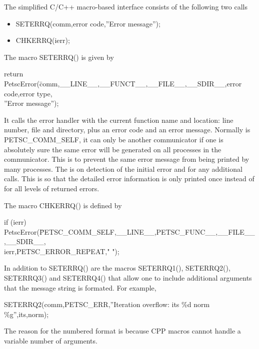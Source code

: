 \documentclass[twoside,12pt]{../sty/report_petsc}
\begin{document}
The simplified C/C++ macro-based interface consists of the following two calls
\begin{itemize}
\item SETERRQ(comm,error code,''Error message'');
\item CHKERRQ(ierr);
\end{itemize}

The macro SETERRQ() is given by
\begin{tabbing}
return PetscError(\=comm,\_\_LINE\_\_,\_\_FUNCT\_\_,\_\_FILE\_\_,\_\_SDIR\_\_,error code,error type,\\
\> ''Error message'');
\end{tabbing}
It calls the error handler with the current function name and location: line number,
file and directory, plus an error code and an error message. Normally  is PETSC_COMM_SELF, it can only be another communicator if
one is absolutely sure the same error will be generated on all processes in the communicator. This is to prevent the same error message from
being printed by many processes. The  is  on detection of the initial error and  for any additional calls. This is so that
the detailed error information is only printed once instead of for all levels of returned errors.

The macro CHKERRQ() is defined by
\begin{tabbing}
  if (ierr)  PetscError(\=PETSC\_COMM\_SELF,\_\_LINE\_\_,PETSC\_FUNC\_\_,\_\_FILE\_\_,\_\_SDIR\_\_, \\
 \>ierr,PETSC\_ERROR\_REPEAT," ");
\end{tabbing}

In addition to SETERRQ() are the macros SETERRQ1(), SETERRQ2(), SETERRQ3()
and SETERRQ4() that allow one to include additional arguments that the message
string is formated. For example,
\begin{tabbing}
  SETERRQ2(comm,PETSC\_ERR,''Iteration overflow: its \%d norm \%g'',its,norm);
\end{tabbing}
The reason for the numbered format is because CPP macros cannot handle a variable number
of arguments.
\end{document}
